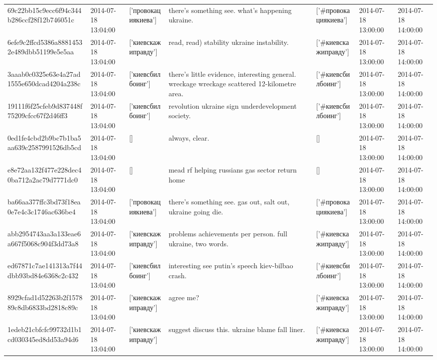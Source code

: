 \begin{tabular}{lllllll}
69c22bb15c9ecc6f94c344b286ccf28f12b746051c & 2014-07-18 13:04:00 & ['провокациякиева'] & there's something see. what's happening ukraine. & ['#провокациякиева'] & 2014-07-18 13:00:00 & 2014-07-18 14:00:00 \\
6efe9c2ffcd5386a88814532e489dbb51199e5e5aa & 2014-07-18 13:04:00 & ['киевскажиправду'] & read, read) stability ukraine instability. & ['#киевскажиправду'] & 2014-07-18 13:00:00 & 2014-07-18 14:00:00 \\
3aaab0c0325e63e4a27ad1555e650dcad4204a238c & 2014-07-18 13:04:00 & ['киевсбилбоинг'] & there's little evidence, interesting general. wreckage wreckage scattered 12-kilometre area. & ['#киевсбилбоинг'] & 2014-07-18 13:00:00 & 2014-07-18 14:00:00 \\
19111f6f25cfeb9d837448f75209cfcc67f2d46ff3 & 2014-07-18 13:04:00 & ['киевсбилбоинг'] & revolution ukraine sign underdevelopment society. & ['#киевсбилбоинг'] & 2014-07-18 13:00:00 & 2014-07-18 14:00:00 \\
0ed1fe4cbd2b9bc7b1ba5aa639c2587991526db5cd & 2014-07-18 13:04:00 & [] & always, clear. & [] & 2014-07-18 13:00:00 & 2014-07-18 14:00:00 \\
e8e72aa132f477e228dec40ba712a2ac79d7771dc0 & 2014-07-18 13:04:00 & [] & mead rf helping russians gas sector return home & [] & 2014-07-18 13:00:00 & 2014-07-18 14:00:00 \\
ba66aa377ffc3bd73f18ea0e7e4c3c1746ac636be4 & 2014-07-18 13:04:00 & ['провокациякиева'] & there's something see. gas out, salt out, ukraine going die. & ['#провокациякиева'] & 2014-07-18 13:00:00 & 2014-07-18 14:00:00 \\
abb2954743aa3a133eae6a667f5068c904f3dd73a8 & 2014-07-18 13:04:00 & ['киевскажиправду'] & problems achievements per person. full ukraine, two words. & ['#киевскажиправду'] & 2014-07-18 13:00:00 & 2014-07-18 14:00:00 \\
ed67871c7ae141313a7f44dbb93bd84e6368c2c432 & 2014-07-18 13:04:00 & ['киевсбилбоинг'] & interesting see putin's speech kiev-bilbao crash. & ['#киевсбилбоинг'] & 2014-07-18 13:00:00 & 2014-07-18 14:00:00 \\
8929cfad1d52263b2f157889c8db6833bd2818c89c & 2014-07-18 13:04:00 & ['киевскажиправду'] & agree me? & ['#киевскажиправду'] & 2014-07-18 13:00:00 & 2014-07-18 14:00:00 \\
1edeb21cbfcfc99732d1b1cd030345ed8dd53a94d6 & 2014-07-18 13:04:00 & ['киевскажиправду'] & suggest discuss this. ukraine blame fall liner. & ['#киевскажиправду'] & 2014-07-18 13:00:00 & 2014-07-18 14:00:00 \\

\end{tabular}
